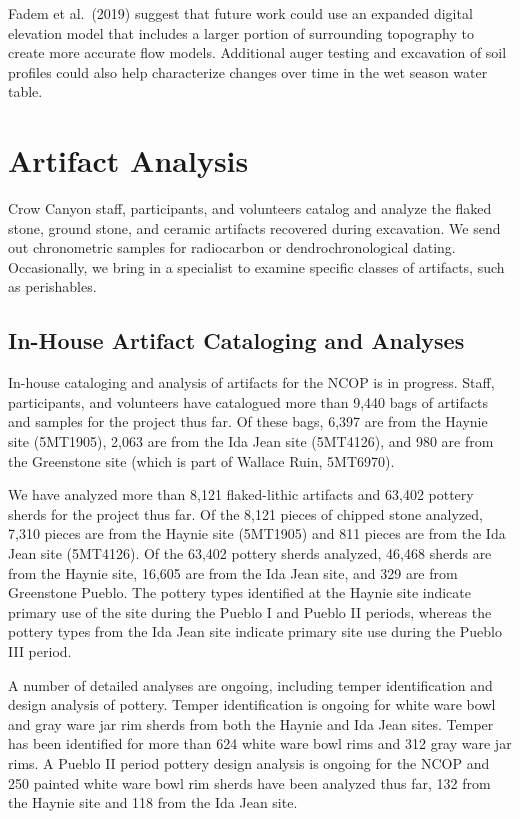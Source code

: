 \documentclass[
  12pt,
]{krantz}
\begin{document}
Fadem et al.~(2019) suggest that future work could use an expanded
digital elevation model that includes a larger portion of surrounding
topography to create more accurate flow models. Additional auger testing
and excavation of soil profiles could also help characterize changes
over time in the wet season water table.

\hypertarget{artifact-analysis}{%
\chapter{Artifact Analysis}\label{artifact-analysis}}

Crow Canyon staff, participants, and volunteers catalog and analyze the
flaked stone, ground stone, and ceramic artifacts recovered during
excavation. We send out chronometric samples for radiocarbon or
dendrochronological dating. Occasionally, we bring in a specialist to
examine specific classes of artifacts, such as perishables.

\hypertarget{in-house-artifact-cataloging-and-analyses}{%
\section{In-House Artifact Cataloging and Analyses}\label{in-house-artifact-cataloging-and-analyses}}

In-house cataloging and analysis of artifacts for the NCOP is in
progress. Staff, participants, and volunteers have catalogued more than
9,440 bags of artifacts and samples for the project thus far. Of these
bags, 6,397 are from the Haynie site (5MT1905), 2,063 are from the Ida
Jean site (5MT4126), and 980 are from the Greenstone site (which is part
of Wallace Ruin, 5MT6970).

We have analyzed more than 8,121 flaked-lithic artifacts and 63,402
pottery sherds for the project thus far. Of the 8,121 pieces of chipped
stone analyzed, 7,310 pieces are from the Haynie site (5MT1905) and 811
pieces are from the Ida Jean site (5MT4126). Of the 63,402 pottery
sherds analyzed, 46,468 sherds are from the Haynie site, 16,605 are from
the Ida Jean site, and 329 are from Greenstone Pueblo. The pottery types
identified at the Haynie site indicate primary use of the site during
the Pueblo I and Pueblo II periods, whereas the pottery types from the
Ida Jean site indicate primary site use during the Pueblo III period.

A number of detailed analyses are ongoing, including temper
identification and design analysis of pottery. Temper identification is
ongoing for white ware bowl and gray ware jar rim sherds from both the
Haynie and Ida Jean sites. Temper has been identified for more than 624
white ware bowl rims and 312 gray ware jar rims. A Pueblo II period
pottery design analysis is ongoing for the NCOP and 250 painted white
ware bowl rim sherds have been analyzed thus far, 132 from the Haynie
site and 118 from the Ida Jean site.
\end{document}
